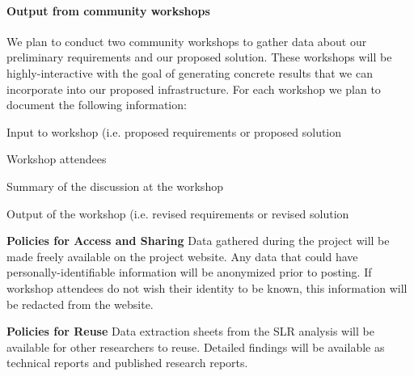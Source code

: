\paragraph{Output from community workshops}
We plan to conduct two community workshops to gather data about our preliminary requirements and our proposed solution. These workshops will be highly-interactive with the goal of generating concrete results that we can incorporate into our proposed infrastructure. For each workshop we plan to document the following information:
\begin{enumerate*}
	\item{Input to workshop (i.e. proposed requirements or proposed solution}
	\item{Workshop attendees}
	\item{Summary of the discussion at the workshop}
	\item{Output of the workshop (i.e. revised requirements or revised solution}
\end{enumerate*}

\textbf{Policies for Access and Sharing}
Data gathered during the project will be made freely available on the project website. Any data that could have personally-identifiable information will be anonymized prior to posting. If workshop attendees do not wish their identity to be known, this information will be redacted from the website.

\textbf{Policies for Reuse}
Data extraction sheets from the SLR analysis will be available for other researchers to reuse. Detailed findings will be available as technical reports and published research reports.

